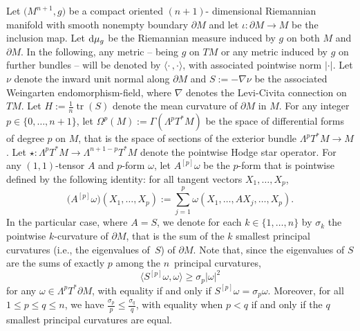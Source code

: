 \documentclass[pdftex]{sigma}
\numberwithin{equation}{section}
\begin{document}
Let $\big(M^{n+1},g\big)$ be a compact oriented $(n+1)$- dimensional Riemannian ma\-ni\-fold with smooth nonempty boundary $\partial M$ and let $\iota\colon\partial M\to M$ be the inclusion map.
Let ${\rm d}\mu_g$ be the Riemannian measure induced by $g$ on both $M$ and $\partial M$.
In the following, any metric -- being $g$ on $TM$ or any metric induced by $g$ on further bundles -- will be denoted by $\langle\cdot\,,\cdot\rangle$, with associated pointwise norm $|\cdot|$.
Let $\nu$ denote the inward unit normal along $\partial M$ and $S:=-\nabla\nu$ be the associated Weingarten endomorphism-field, where $\nabla$ denotes the Levi-Civita connection on $TM$.
Let $H:=\frac{1}{n}\operatorname{tr}(S)$ denote the mean curvature of $\partial M$ in $M$.
For any integer $p\in\{0,\dots,n+1\}$, let $\Omega^p(M):=\Gamma(\Lambda^pT^*M)$ be the space of differential forms of degree $p$ on $M$, that is the space of sections of the exterior bundle $\Lambda^p T^*M\to M$.
Let $\star\colon\Lambda^pT^*M\to\Lambda^{n+1-p}T^*M$ denote the pointwise Hodge star  operator.
For any $(1,1)$-tensor $A$ and $p$-form $\omega$, let $A^{[p]}\omega$ be the $p$-form that is pointwise defined by the following identity: for all tangent vectors $X_1,\dots,X_p$,
\[\bigl(A^{[p]}\omega\bigr)(X_1,\dots,X_p):=\sum_{j=1}^p\omega(X_1,\dots,AX_j,\dots,X_p).\]
In the particular case, where $A=S$, we denote for each $k\in\{1,\dots,n\}$ by $\sigma_k$ the pointwise $k$-curvature of $\partial M$, that is the sum of the $k$ smallest principal curvatures (i.e., the eigenvalues of~$S$) of $\partial M$.
Note that, since the eigenvalues of $S$ are the sums of exactly $p$ among the $n$~principal curvatures,
\[\bigl\langle S^{[p]}\omega,\omega\bigr\rangle\geq\sigma_p|\omega|^2\]
for any $\omega\in\Lambda^pT^*\partial M$, with equality if and only if $S^{[p]}\omega=\sigma_p\omega$.
Moreover, for all $1\leq p\leq q\leq n$, we have $\frac{\sigma_p}{p}\leq\frac{\sigma_q}{q}$, with equality when $p<q$ if and only if the $q$ smallest principal curvatures are equal.
\end{document}
